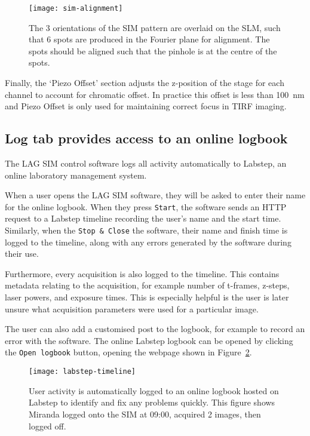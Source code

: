 \begin{figure}[htbp!]
\centering
\texttt{[image: sim-alignment]}
\caption[LAG SIM: Displaying specially designed patterns on the SLM assists with alignment of LAG SIM]{The 3 orientations of the SIM pattern are overlaid on the SLM, such that 6 spots are produced in the Fourier plane for alignment. The spots should be aligned such that the pinhole is at the centre of the spots.}
\label{fig:pinhole-alignment}
\end{figure}

Finally, the `Piezo Offset' section adjusts the z-position of the stage for each channel to account for chromatic offset. 
In practice this offset is less than \SI{100}{\nano\meter} and Piezo Offset is only used for maintaining correct focus in TIRF imaging. 

\subsection{Log tab provides access to an online logbook}
The LAG SIM control software logs all activity automatically to Labstep, an online laboratory management system. 

When a user opens the LAG SIM software, they will be asked to enter their name for the online logbook. 
When they press \texttt{Start}, the software sends an HTTP request to a Labstep timeline recording the user's name and the start time. 
Similarly, when the \texttt{Stop \& Close} the software, their name and finish time is logged to the timeline, along with any errors generated by the software during their use. 

Furthermore, every acquisition is also logged to the timeline. 
This contains metadata relating to the acquisition, for example number of t-frames, z-steps, laser powers, and exposure times. 
This is especially helpful is the user is later unsure what acquisition parameters were used for a particular image. 

The user can also add a customised post to the logbook, for example to record an error with the software. 
The online Labstep logbook can be opened by clicking the \texttt{Open logbook} button, opening the webpage shown in Figure~\ref{fig:labstepTimeline}. 

\begin{figure}[htbp!]
\centering
\texttt{[image: labstep-timeline]}
\caption[LAG SIM: Logging user activity with Labstep allows any problems to be identified and fixed quickly]{User activity is automatically logged to an online logbook hosted on Labstep to identify and fix any problems quickly. This figure shows Miranda logged onto the SIM at 09:00, acquired 2 images, then logged off.} %
\label{fig:labstepTimeline}
\end{figure}

